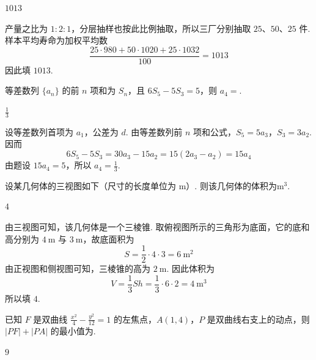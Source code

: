 \begin{answer}
\(1013\)
\end{answer}

\begin{solution}
产量之比为 \(1:2:1\)，分层抽样也按此比例抽取，所以三厂分别抽取 \(25\)、\(50\)、\(25\) 件. 样本平均寿命为加权平均数
\[
\frac{25\cdot980+50\cdot1020+25\cdot1032}{100}=1013
\]
因此填 \(1013\).
\end{solution}

\begin{problem}
等差数列 \(\{a_{n}\}\) 的前 \(n\) 项和为 \(S_{n}\)，且 \(6S_{5} - 5S_{3} = 5\)，则 \(a_{4} = \)\fillinblank{}.
\end{problem}

\begin{answer}
\(\frac{1}{3}\)
\end{answer}

\begin{solution}
设等差数列首项为 \(a_1\)，公差为 \(d\). 由等差数列前 \(n\) 项和公式，\(S_5=5a_3\)，\(S_3=3a_2\). 因而
\[
6S_5-5S_3=30a_3-15a_2=15(2a_3-a_2)=15a_4
\]
由题设 \(15a_4=5\)，所以 \(a_4=\frac13\).
\end{solution}

\begin{problem}
设某几何体的三视图如下（尺寸的长度单位为 \(\mathrm{m}\)）. 则该几何体的体积为\fillinblank{}\(\mathrm{m}^{3}\).

\end{problem}

\begin{answer}
\(4\)
\end{answer}

\begin{solution}
由三视图可知，该几何体是一个三棱锥. 取俯视图所示的三角形为底面，它的底和高分别为 \(4\mathrm{~m}\) 与 \(3\mathrm{~m}\)，故底面积为
\[
S=\frac12\cdot4\cdot3=6\mathrm{~m}^2
\]
由正视图和侧视图可知，三棱锥的高为 \(2\mathrm{~m}\). 因此体积为
\[
V=\frac13Sh=\frac13\cdot6\cdot2=4\mathrm{~m}^3
\]
所以填 \(4\).
\end{solution}

\begin{problem}
已知 \(F\) 是双曲线 \(\frac{x^2}{4} - \frac{y^2}{12} = 1\) 的左焦点，\(A(1,4)\)，\(P\) 是双曲线右支上的动点，则 \(|PF| + |PA|\) 的最小值为\fillinblank{}.
\end{problem}

\begin{answer}
\(9\)
\end{answer}

